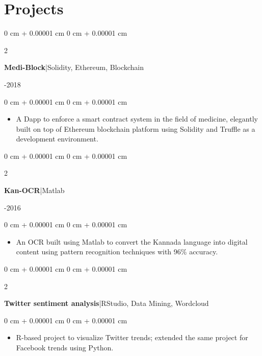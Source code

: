 \documentclass[10pt, letterpaper]{article}
\newenvironment{highlights}{
    \begin{itemize}[
        topsep=0.10 cm,
        parsep=0.10 cm,
        partopsep=0pt,
        itemsep=0pt,
        leftmargin=0 cm + 10pt
    ]
}{
    \end{itemize}
} %
\newenvironment{onecolentry}{
    \begin{adjustwidth}{
        0 cm + 0.00001 cm
    }{
        0 cm + 0.00001 cm
    }
}{
    \end{adjustwidth}
} %
\newenvironment{twocolentry}[2][]{
    \onecolentry
    \def\secondColumn{#2}
    \setcolumnwidth{\fill, 4.5 cm}
    \begin{paracol}{2}
}{
    \switchcolumn \raggedleft \secondColumn
    \end{paracol}
    \endonecolentry
} %
\begin{document}
    \section{Projects}

        \begin{twocolentry}{2017-2018}
            \textbf{Medi-Block}|Solidity, Ethereum, Blockchain
        \end{twocolentry}
        \begin{onecolentry}
          \begin{highlights}
                \item A Dapp to enforce a smart contract system in the field of medicine, elegantly built on top of Ethereum blockchain platform using Solidity and Truffle as a development environment.
         \end{highlights}
        \end{onecolentry}

        \vspace{0.2 cm}

        \begin{twocolentry}{2012-2016}
            \textbf{Kan-OCR}|Matlab
        \end{twocolentry}
        \begin{onecolentry}
          \begin{highlights}
              \item An OCR built using Matlab to convert the Kannada language into digital content using pattern recognition techniques with 96\% accuracy.
            \end{highlights}
        \end{onecolentry}

        \vspace{0.2 cm}

        \begin{twocolentry}{2016}
           \textbf{Twitter sentiment analysis}|RStudio, Data Mining, Wordcloud
        \end{twocolentry}
        \begin{onecolentry}
            \begin{highlights}
               \item R-based project to visualize Twitter trends; extended the same project for Facebook trends using Python.
         \end{highlights}
        \end{onecolentry}

        \vspace{0.2 cm}
\end{document}
